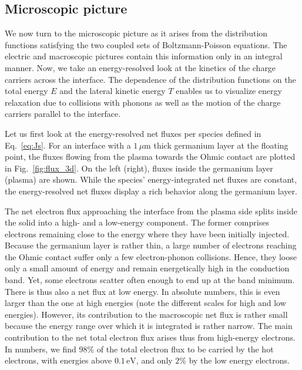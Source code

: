 \documentclass[pre,reprint,floats]{revtex4-1}
\begin{document}
\subsection{Microscopic picture}\label{sec:MicP}

We now turn to the microscopic picture as it arises from the distribution functions satisfying the 
two coupled sets of Boltzmann-Poisson equations. The electric and macroscopic pictures contain
this information only in an integral manner. Now, we take an energy-resolved look at the 
kinetics of the charge carriers across the interface. The dependence of the distribution functions 
on the total energy $E$ and the lateral kinetic energy $T$ enables us to visualize energy relaxation 
due to collisions with phonons as well as the motion of the charge carriers parallel to the interface.

Let us first look at the energy-resolved net fluxes per species defined in Eq.~\eqref{eq:Js}. For 
an interface with a $1\,\mu\mathrm{m}$ thick germanium layer at the floating point, the fluxes 
flowing from the plasma towards the Ohmic contact are plotted in Fig.~\ref{fig:flux_3d}. On the 
left (right), fluxes inside the germanium layer (plasma) are shown. While the species' energy-integrated 
net fluxes are constant, the energy-resolved net fluxes display a rich behavior along the germanium layer.

The net electron flux approaching the interface from the plasma side splits inside the solid into
a high- and a low-energy component. The former comprises electrons remaining close to the energy 
where they have been initially injected. Because the germanium layer is rather thin, a large 
number of electrons reaching the Ohmic contact suffer only a few electron-phonon collisions. 
Hence, they loose only a small amount of energy and remain energetically high in the conduction 
band. Yet, some electrons scatter often enough to end up at the band minimum. There is thus also 
a net flux at low energy. In absolute numbers, this is even larger than the one at high energies
(note the different scales for high and low energies). However, its contribution to the macroscopic 
net flux is rather small because the energy range over which it is integrated is rather narrow. 
The main contribution to the net total electron flux arises thus from high-energy electrons.
In numbers, we find $98\%$ of the total electron flux to be carried by the hot electrons, with 
energies above $0.1\,\mathrm{eV}$, and only $2\%$ by the low energy electrons.
\end{document}
